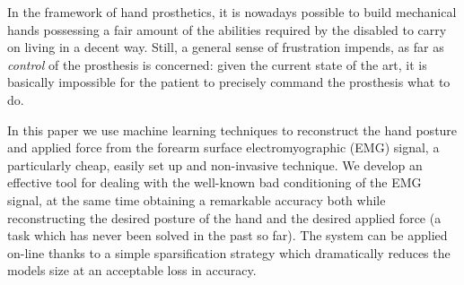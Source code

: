 In the framework of hand prosthetics, it is nowadays possible to build
mechanical hands possessing a fair amount of the abilities required by
the disabled to carry on living in a decent way. Still, a general
sense of frustration impends, as far as \emph{control} of the
prosthesis is concerned: given the current state of the art, it is
basically impossible for the patient to precisely command the
prosthesis what to do.

In this paper we use machine learning techniques to reconstruct the
hand posture and applied force from the forearm surface
electromyographic (EMG) signal, a particularly cheap, easily set up
and non-invasive technique. We develop an effective tool for dealing
with the well-known bad conditioning of the EMG signal, at the same
time obtaining a remarkable accuracy both while reconstructing the
desired posture of the hand and the desired applied force (a task
which has never been solved in the past so far). The system can be
applied on-line thanks to a simple sparsification strategy which
dramatically reduces the models size at an acceptable loss in
accuracy.
